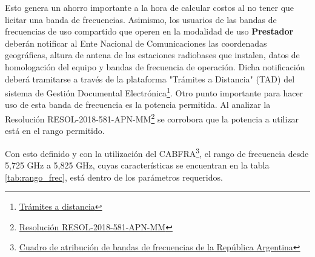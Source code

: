 \documentclass[11pt,a4paper]{article}
\begin{document}
Esto genera un ahorro importante a la hora de calcular costos al no tener que licitar una banda de frecuencias. Asimismo, los usuarios de las bandas de frecuencias de uso compartido que operen en la modalidad de uso \textbf{Prestador} deberán notificar al Ente Nacional de Comunicaciones las coordenadas geográficas, altura de antena de las estaciones radiobases que instalen, datos de homologación del equipo y bandas de frecuencia de operación. Dicha notificación deberá tramitarse a través de la plataforma "Trámites a Distancia" (TAD) del sistema de Gestión Documental Electrónica\footnote{\href{https://tramitesadistancia.gob.ar/}{Trámites a distancia}}. Otro punto importante para hacer uso de esta banda de frecuencia es la potencia permitida. Al analizar la Resolución RESOL-2018-581-APN-MM\footnote{\href{https://www.enacom.gob.ar/multimedia/normativas/2018/res581MM.pdf}{Resolución RESOL-2018-581-APN-MM}} se corrobora que la potencia a utilizar está en el rango permitido.

Con esto definido y con la utilización del CABFRA\footnote{\href{https://www.enacom.gob.ar/cuadro-de-atribucion-de-bandas-de-frecuencias-de-la-republica-argentina-cabfra-\_p1588}{Cuadro de atribución de bandas de frecuencias de la República Argentina}}, el rango de frecuencia desde 5,725 GHz a 5,825 GHz, cuyas características se encuentran en la tabla \ref{tab:rango_frec}, está dentro de los parámetros requeridos. 


\begin{table}[htbp]
%
    \caption{características para el rango de frecuencia entre 5.725 y 5.825 MHz.}
  \label{tab:rango_frec}%
\end{table}%
\end{document}
